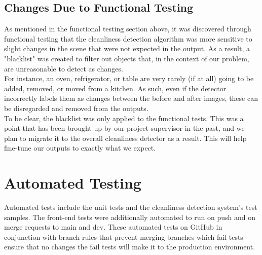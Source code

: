 \documentclass[12pt, titlepage]{article}
\begin{document}
\subsection{Changes Due to Functional Testing}
As mentioned in the functional testing section above, it was discovered through functional testing that the cleanliness detection algorithm was more sensitive to slight changes in the scene that were not expected in the output. As a result, a "blacklist" was created to filter out objects that, in the context of our problem, are unreasonable to detect as changes.\\

For instance, an oven, refrigerator, or table are very rarely (if at all) going to be added, removed, or moved from a kitchen. As such, even if the detector incorrectly labels them as changes between the before and after images, these can be disregarded and removed from the outputs.\\

To be clear, the blacklist was only applied to the functional tests. This was a point that has been brought up by our project supervisor in the past, and we plan to migrate it to the overall cleanliness detector as a result. This will help fine-tune our outputs to exactly what we expect.

\section{Automated Testing}
Automated tests include the unit tests and the cleanliness detection system's test samples. The front-end tests were additionally automated to run on push and on merge requests to main and dev. These automated tests on GitHub in conjunction with branch rules that prevent merging branches which fail tests ensure that no changes the fail tests will make it to the production environment.
		
\end{document}
